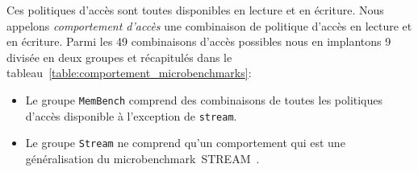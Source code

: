 










Ces politiques d'accès sont toutes disponibles en lecture et en écriture.
Nous appelons \emph{comportement d'accès} une combinaison de politique d'accès en lecture et en écriture.
Parmi les 49 combinaisons d'accès possibles nous en implantons 9 divisée en deux groupes et récapitulés dans le tableau~\ref{table:comportement_microbenchmarks}:
\begin{itemize}
	\item Le groupe \texttt{MemBench} comprend des combinaisons de toutes les politiques d'accès disponible à l'exception de \texttt{stream}.
	\item Le groupe \texttt{Stream} ne comprend qu'un comportement qui est une généralisation du microbenchmark~\textsc{STREAM}~\cite{McCalpin1995}.
\end{itemize}


\newcommand\available{\checkmark}
\newcommand\navailable{$\times$}

